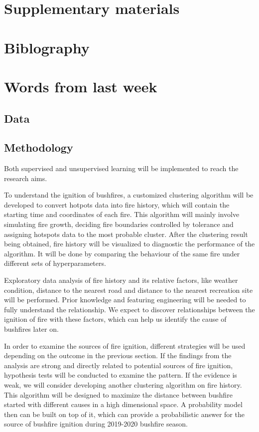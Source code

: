 \documentclass{monashthesis}
\begin{document}
\chapter{Supplementary materials}\label{supplementary-materials}

\chapter{Biblography}\label{biblography}

\chapter{Words from last week}\label{words-from-last-week}

\section{Data}\label{data}

\section{Methodology}\label{methodology}

Both supervised and unsupervised learning will be implemented to reach
the research aims.

To understand the ignition of bushfires, a customized clustering
algorithm will be developed to convert hotpots data into fire history,
which will contain the starting time and coordinates of each fire. This
algorithm will mainly involve simulating fire growth, deciding fire
boundaries controlled by tolerance and assigning hotspots data to the
most probable cluster. After the clustering result being obtained, fire
history will be visualized to diagnostic the performance of the
algorithm. It will be done by comparing the behaviour of the same fire
under different sets of hyperparameters.

Exploratory data analysis of fire history and its relative factors, like
weather condition, distance to the nearest road and distance to the
nearest recreation site will be performed. Prior knowledge and featuring
engineering will be needed to fully understand the relationship. We
expect to discover relationships between the ignition of fire with these
factors, which can help us identify the cause of bushfires later on.

In order to examine the sources of fire ignition, different strategies
will be used depending on the outcome in the previous section. If the
findings from the analysis are strong and directly related to potential
sources of fire ignition, hypothesis tests will be conducted to examine
the pattern. If the evidence is weak, we will consider developing
another clustering algorithm on fire history. This algorithm will be
designed to maximize the distance between bushfire started with
different causes in a high dimensional space. A probability model then
can be built on top of it, which can provide a probabilistic answer for
the source of bushfire ignition during 2019-2020 bushfire season.
\end{document}
